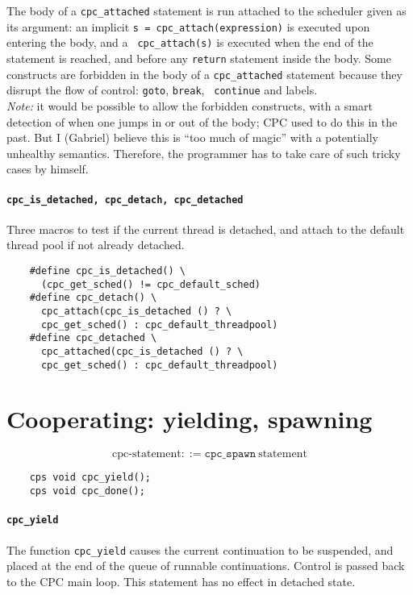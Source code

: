 \documentclass[a4paper]{report}
\begin{document}
The body of a {\tt cpc\_attached} statement is run attached to the
scheduler given as its argument: an implicit {\tt s =
cpc\_attach(expression)} is executed upon entering the body, and a {\tt
cpc\_attach(s)} is executed when the end of the statement is reached,
and before any {\tt return} statement inside the body.  Some constructs
are forbidden in the body of a {\tt cpc\_attached} statement because
they disrupt the flow of control: {\tt goto}, {\tt break}, {\tt
continue} and labels.\\
{\em Note:\/} it would be possible to allow the forbidden constructs,
with a smart detection of when one jumps in or out of the body; CPC used
to do this in the past.  But I (Gabriel) believe this is ``too much of magic''
with a potentially unhealthy semantics.  Therefore, the programmer has to take
care of such tricky cases by himself.

\paragraph{\tt cpc\_is\_detached, cpc\_detach, cpc\_detached} Three macros to
test if the current thread is detached, and attach to the default thread pool
if not already detached.
\begin{verbatim}
    #define cpc_is_detached() \
      (cpc_get_sched() != cpc_default_sched)
    #define cpc_detach() \
      cpc_attach(cpc_is_detached () ? \
      cpc_get_sched() : cpc_default_threadpool)
    #define cpc_detached \
      cpc_attached(cpc_is_detached () ? \
      cpc_get_sched() : cpc_default_threadpool)
\end{verbatim}
\section{Cooperating: yielding, spawning} \label{sec:cooperating}

\[ \mbox{cpc-statement} ::=
   \mathtt{cpc\_spawn}\ \mbox{statement} \]
\begin{verbatim}
    cps void cpc_yield();
    cps void cpc_done();
\end{verbatim}

\paragraph{\tt cpc\_yield} The function {\tt cpc\_yield} causes the
current continuation to be suspended, and placed at the end of the
queue of runnable continuations.  Control is passed back to the CPC
main loop.  This statement has no effect in detached state.
\end{document}
